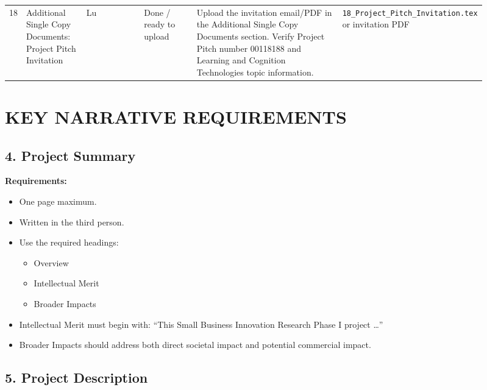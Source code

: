 \documentclass[11pt,letterpaper]{article}
\begin{document}
\begin{landscape}
\begin{longtable}{
    L{0.02\linewidth}
    L{0.13\linewidth}
    L{0.14\linewidth}
    L{0.12\linewidth}
    L{0.35\linewidth}
    L{0.15\linewidth}
}
\midrule

18 &
Additional Single Copy Documents: Project Pitch Invitation &
Lu &
Done / ready to upload  &
Upload the invitation email/PDF in the Additional Single Copy Documents
section. Verify Project Pitch number 00118188 and Learning and Cognition
Technologies topic information.&
\texttt{18\_Project\_Pitch\_Invitation.tex} or invitation PDF
\\

\end{longtable}

\end{landscape}

\section*{KEY NARRATIVE REQUIREMENTS}

\subsection*{4. Project Summary}

\textbf{Requirements:}

\begin{itemize}[leftmargin=0.25in]
    \item One page maximum.
    \item Written in the third person.
    \item Use the required headings:
    \begin{itemize}
        \item Overview
        \item Intellectual Merit
        \item Broader Impacts
    \end{itemize}
    \item Intellectual Merit must begin with:
    ``This Small Business Innovation Research Phase I project \ldots''
    \item Broader Impacts should address both direct societal impact and
    potential commercial impact.
\end{itemize}

\subsection*{5. Project Description}
\end{document}
